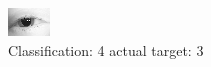 \begin{figure}[h!]
\begin{center}
\includegraphics[width=0.60\columnwidth]{figures/ID37_class_4_target_3.png}
\end{center}
\caption{ Classification: 4 actual target: 3}
\label{fig:ID37_class_4_target_3}
\end{figure}
